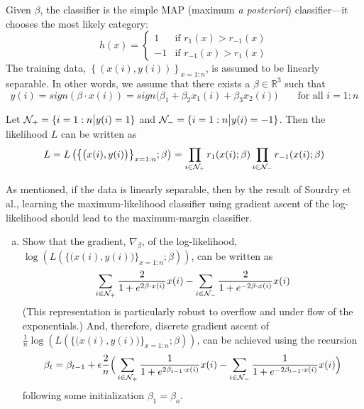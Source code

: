\documentclass[11pt]{report}
\begin{document}
\begin{enumerate}[1.]
	      Given $\beta$, the classifier is the simple MAP (maximum {\it a posteriori}) classifier---it chooses the most likely category:
	      \[
		      h(x) = \begin{cases}
			      1  & \text{if } r_1(x) > r_{-1}(x) \\
			      -1 & \text{if } r_{-1}(x) > r_1(x)
		      \end{cases}
	      \]
	      The training data, $\left\{\left(x(i),y(i)\right)\right\}_{x=1:n}$, is assumed to be linearly separable. In other words, we assume that there exists a $\beta \in\mathds{R}^3$ such that
	      \[
		      y(i) = sign\left(\beta \cdot x(i)\right) = sign\big(\beta_1 + \beta_2 x_1(i) + \beta_3 x_2(i)\big)\qquad\text{for all $i=1:n$}
	      \]

	      Let ${\cal N}_+ = \{i=1:n\big|y(i) = 1\}$ and ${\cal N}_- = \{i=1:n\big|y(i) = -1\}$. Then the likelihood $L$ can be written as
	      \[
		      L=L\left(\big\{\big(x(i),y(i)\big)\big\}_{x=1:n};\beta\right) = \prod_{i\in{\cal N}_+}r_1(x(i);\beta) \prod_{i\in{\cal N}_-}r_{-1}(x(i);\beta)
	      \]

	      As mentioned, if the data is linearly separable, then by the result of Sourdry et al., learning the maximum-likelihood classifier using gradient ascent of the log-likelihood should lead to the maximum-margin classifier.

	      \begin{enumerate}[(a)]
		      \item
		            Show that the gradient, $\nabla_\beta$, of the log-likelihood, $\log(L\left(\big\{\big(x(i),y(i)\big)\big\}_{x=1:n};\beta\right))$, can be written as
		            \begin{equation}
			            \label{eqn:gradient}
			            \sum_{i\in{\cal N}_+}  \frac{2}{1+e^{2\beta\cdot x(i)}}x(i)    -
			            \sum_{i\in{\cal N}_-}   \frac{2}{1+e^{-2\beta\cdot x(i)}}x(i)
		            \end{equation}
		            (This representation is particularly robust to overflow and under flow of the exponentials.)
		            And, therefore, discrete gradient ascent of $\frac{1}{n} \log(L\left(\big\{\big(x(i),y(i)\big)\big\}_{x=1:n};\beta\right))$,
		            can be achieved using the recursion
		            \[
			            \beta_t =
			            \beta_{t-1} + \epsilon\frac{2}{n}
			            \Big(
			            \sum_{i\in{\cal N}_+}  \frac{1}{1+e^{2\beta_{t-1}\cdot x(i)}}x(i)    -
			            \sum_{i\in{\cal N}_-}   \frac{1}{1+e^{-2\beta_{t-1}\cdot x(i)}}x(i)
			            \Big)
		            \]
		            following some initialization $\beta_1 = \beta_o$.


\end{enumerate}
\end{enumerate}
\end{document}
